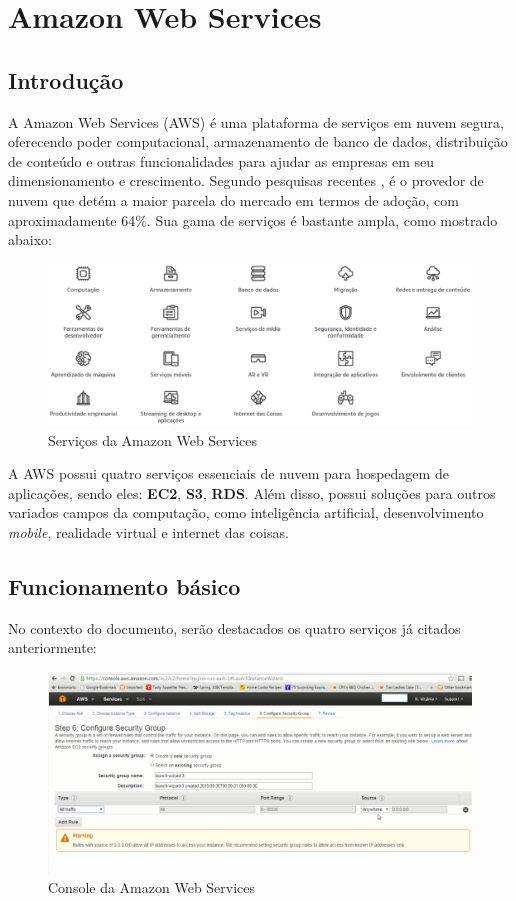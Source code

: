 \chapter{Amazon Web Services}

\section{Introdução}
A Amazon Web Services (AWS) é uma plataforma de serviços em nuvem segura, oferecendo poder computacional, armazenamento de banco de dados, distribuição de conteúdo e outras funcionalidades para ajudar as empresas em seu dimensionamento e crescimento. Segundo pesquisas recentes \cite{rightscale}, é o provedor de nuvem que detém a maior parcela do mercado em termos de adoção, com aproximadamente 64\%. Sua gama de serviços é bastante ampla, como mostrado abaixo:

\begin{figure}[h!]
  \centering
  \includegraphics[scale=0.38]{imagens/aws-services.eps}
  \caption{Serviços da Amazon Web Services\cite{aws-services}}
\end{figure}

A AWS possui quatro serviços essenciais de nuvem para hospedagem de aplicações, sendo eles: \textbf{EC2}, \textbf{S3}, \textbf{RDS}. Além disso, possui soluções para outros variados campos da computação, como inteligência artificial, desenvolvimento \textit{mobile}, realidade virtual e internet das coisas.


\section{Funcionamento básico}
No contexto do documento, serão destacados os quatro serviços já citados anteriormente:


\begin{figure}[h!]
  \centering
  \includegraphics[scale=0.42]{imagens/aws-console.eps}
  \caption{Console da Amazon Web Services}
\end{figure}


